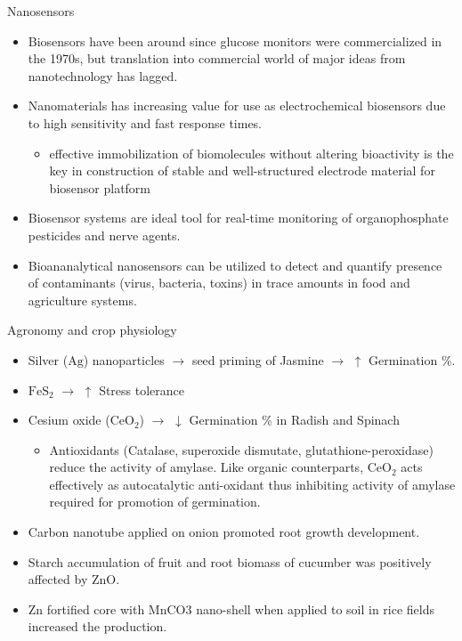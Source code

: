 \documentclass[11pt,dvipsnames,ignorenonframetext,aspectratio=169]{beamer}
\providecommand{\tightlist}{%
  \setlength{\itemsep}{0pt}\setlength{\parskip}{0pt}}
\begin{document}
\begin{frame}{Nanosensors}
\protect\hypertarget{nanosensors}{}
\begin{itemize}
\tightlist
\item
  Biosensors have been around since glucose monitors were commercialized
  in the 1970s, but translation into commercial world of major ideas
  from nanotechnology has lagged.
\item
  Nanomaterials has increasing value for use as electrochemical
  biosensors due to high sensitivity and fast response times.

  \begin{itemize}
  \tightlist
  \item
    effective immobilization of biomolecules without altering
    bioactivity is the key in construction of stable and well-structured
    electrode material for biosensor platform
  \end{itemize}
\item
  Biosensor systems are ideal tool for real-time monitoring of
  organophosphate pesticides and nerve agents.
\item
  Bioananalytical nanosensors can be utilized to detect and quantify
  presence of contaminants (virus, bacteria, toxins) in trace amounts in
  food and agriculture systems.
\end{itemize}
\end{frame}

\begin{frame}{Agronomy and crop physiology}
\protect\hypertarget{agronomy-and-crop-physiology}{}
\begin{itemize}
\tightlist
\item
  Silver (\(\mathrm{Ag}\)) nanoparticles \(\longrightarrow\) seed
  priming of Jasmine \(\longrightarrow\) \(\uparrow\) Germination \%.
\item
  \(\mathrm{FeS_2}\) \(\longrightarrow\) \(\uparrow\) Stress tolerance
\item
  Cesium oxide (\(\mathrm{CeO_2}\)) \(\longrightarrow\) \(\downarrow\)
  Germination \% in Radish and Spinach

  \begin{itemize}
  \tightlist
  \item
    Antioxidants (Catalase, superoxide dismutate,
    glutathione-peroxidase) reduce the activity of amylase. Like organic
    counterparts, \(\mathrm{CeO_2}\) acts effectively as autocatalytic
    anti-oxidant thus inhibiting activity of amylase required for
    promotion of germination.
  \end{itemize}
\item
  Carbon nanotube applied on onion promoted root growth development.
\item
  Starch accumulation of fruit and root biomass of cucumber was
  positively affected by \(\mathrm{ZnO}\).
\item
  \(\mathrm{Zn}\) fortified core with \(\mathrm{MnCO3}\) nano-shell when
  applied to soil in rice fields increased the production.
\end{itemize}
\end{frame}
\end{document}

